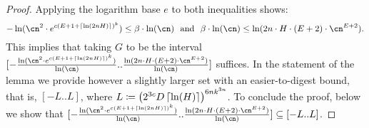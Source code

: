 \begin{proof}
        Applying the logarithm base $e$ to both inequalities shows: 
        \begin{equation*} 
          -\ln(\cn^2 \cdot e^{c(E+1+\ceil{\ln(2nH)})^k}) \leq \beta \cdot \ln(\cn) \text{ \ and \ } \beta \cdot \ln(\cn) \leq \ln(2n \cdot H \cdot (E+2) \cdot \cn^{E+2}).
        \end{equation*}
        This implies that taking $G$ to be the interval 
        $[-\frac{\ln(\cn^2 \cdot e^{c(E+1+\ceil{\ln(2nH)})^k})}{\ln(\cn)}..
          \frac{\ln(2n \cdot H \cdot (E+2) \cdot \cn^{E+2})}{\ln(\cn)}]$
        suffices. In the statement of the lemma we provide however a slightly larger set with an easier-to-digest bound, that is, $[-L..L]$, where $L \coloneqq \left(2^{3c}D\left\lceil\ln(H)\right\rceil\right)^{6nk^{3n}}$.  
        To conclude the proof, below we show that
        $[-\frac{\ln(\cn^2 \cdot e^{c(E+1+\ceil{\ln(2nH)})^k})}{\ln(\cn)}..
        \frac{\ln(2n \cdot H \cdot (E+2) \cdot \cn^{E+2})}{\ln(\cn)}] \subseteq [-L..L]$.
  

\end{proof}
